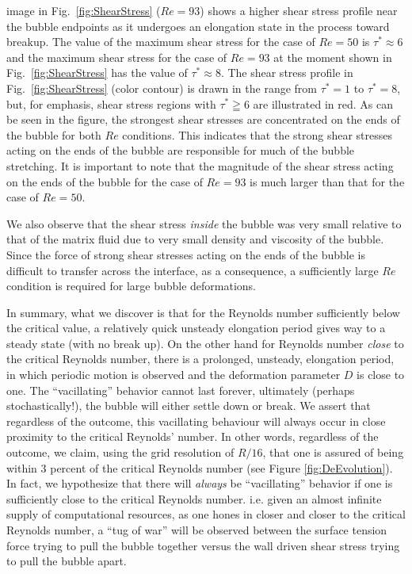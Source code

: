 \documentclass[review]{elsarticle}
\begin{document}
image in Fig.~\ref{fig:ShearStress} ($Re=93$)
shows a higher shear stress profile near
the bubble endpoints as it undergoes an elongation
state in the process toward breakup.  
The value of the maximum shear stress for
the case of $Re = 50$ is $\tau ^{\ast} \approx 6$ 
and the maximum shear stress
for the case of $Re = 93$ at the moment 
shown in Fig.~\ref{fig:ShearStress} has
the value of $\tau ^{\ast} \approx 8$.  
The shear stress profile in
Fig.~\ref{fig:ShearStress} (color contour) is drawn in the range from 
$\tau^{\ast} = 1$ to $\tau ^{\ast} = 8$, but, for emphasis, 
shear stress regions
with $\tau ^{\ast} \geqq 6$ are illustrated in red.  
As can be seen in the
figure, the strongest shear stresses are concentrated on the 
ends of the bubble for both $Re$ conditions.  
This indicates that the strong shear stresses acting
on the ends of the bubble are responsible for much of the bubble stretching.
It is important to note that the magnitude of the shear stress acting on the
ends of the bubble for the case of $Re = 93$ is much larger than that for the
case of $Re = 50$.  

We also observe that the shear stress {\em inside} the bubble was very small
relative to that of the matrix fluid due to very small density and viscosity of
the bubble.  Since the force of strong shear stresses acting on the ends of the
bubble is difficult to transfer across the interface, as a consequence, a
sufficiently large $Re$ condition is required for large bubble deformations.  
\par\noindent
In summary, what we discover is that for the Reynolds
number sufficiently below the critical value, a relatively quick
unsteady elongation period gives way to a steady state (with no
break up).  On
the other hand for Reynolds number {\em close} to the critical Reynolds
number, there is a prolonged, unsteady, elongation period, in which
periodic motion is observed and the deformation parameter $D$ is close 
to one.  The ``vacillating''
behavior cannot last forever, ultimately (perhaps stochastically!),
the bubble will either settle down or break.  We assert that regardless
of the outcome, this vacillating behaviour will always occur
in close proximity to the critical Reynolds' number.  In other words,
regardless of the outcome, we claim, using the grid resolution of
$R/16$, that one is assured of being within 
3 percent of the critical Reynolds number (see Figure \ref{fig:DeEvolution}).  
In fact,
we hypothesize that there will {\em always} be ``vacillating'' behavior
if one is sufficiently close to the critical Reynolds number.  i.e.
given an almost infinite supply of computational resources, as one hones
in closer and closer to the critical Reynolds number, a ``tug of war''
will be observed between the surface tension force trying to pull the
bubble together versus the wall driven shear stress trying to pull the
bubble apart.  
\end{document}
